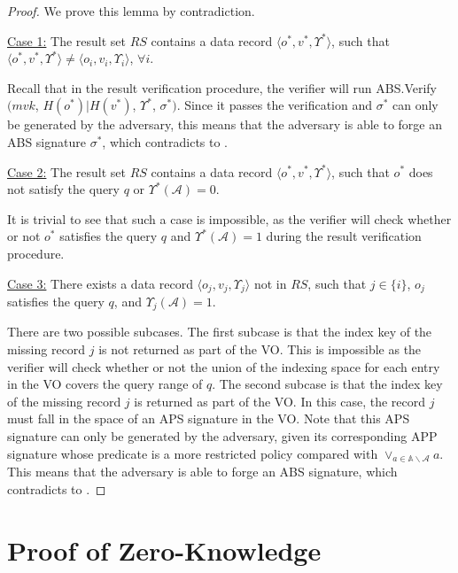 \begin{proof}
  We prove this lemma by contradiction.

  \noindent\underline{Case 1:} The result set $RS$ contains a data record $\langle o^*, v^*, \Upsilon^*\rangle$, such that $\langle o^*, v^*, \Upsilon^*\rangle \neq \langle o_i, v_i, \Upsilon_i\rangle$, $\forall i$.

  Recall that in the result verification procedure, the verifier will run \textsf{ABS.Verify}$(mvk$, $H(o^*)|H(v^*)$, $\Upsilon^*$, $\sigma^*)$. Since it passes the verification and $\sigma^*$ can only be generated by the adversary, this means that the adversary is able to forge an ABS signature $\sigma^*$, which contradicts to .

  \noindent\underline{Case 2:} The result set $RS$ contains a data record $\langle o^*, v^*, \Upsilon^*\rangle$, such that $o^*$ does not satisfy the query $q$ or $\Upsilon^*(\mathcal{A}) = 0$.

  It is trivial to see that such a case is impossible, as the verifier will check whether or not $o^*$ satisfies the query $q$ and $\Upsilon^*(\mathcal{A}) = 1$ during the result verification procedure.

  \noindent\underline{Case 3:} There exists a data record $\langle o_j, v_j, \Upsilon_j\rangle$ not in $RS$, such that $j \in \{i\}$, $o_j$ satisfies the query $q$, and $\Upsilon_j(\mathcal{A})= 1$.

  There are two possible subcases. The first subcase is that the index key of the missing record $j$ is not returned as part of the VO\@. This is impossible as the verifier will check whether or not the union of the indexing space for each entry in the VO covers the query range of $q$. The second subcase is that the index key of the missing record $j$ is returned as part of the VO\@. In this case, the record $j$ must fall in the space of an APS signature in the VO\@. Note that this APS signature can only be generated by the adversary, given its corresponding APP signature whose predicate is a more restricted policy compared with $\lor_{a \in \mathbb{A}\backslash\mathcal{A}} a$.
  This means that the adversary is able to forge an ABS signature,
  which contradicts to .
\end{proof}

\section{Proof of Zero-Knowledge}

